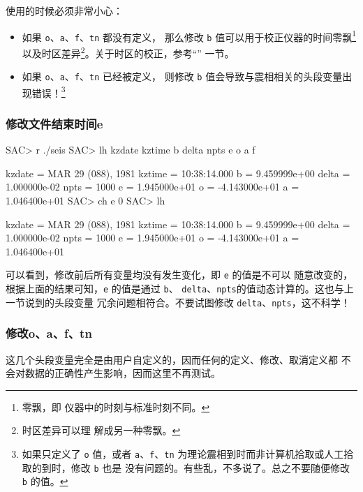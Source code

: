 使用的时候必须非常小心：
\begin{itemize}
\item 如果 \texttt{o}、\texttt{a}、\texttt{f}、\texttt{tn} 都没有定义，
    那么修改 \texttt{b} 值可以用于校正仪器的时间零飘\footnote{零飘，即
    仪器中的时刻与标准时刻不同。}以及时区差异\footnote{时区差异可以理
    解成另一种零飘。}。关于时区的校正，参考``''
    一节。
\item 如果 \texttt{o}、\texttt{a}、\texttt{f}、\texttt{tn} 已经被定义，
    则修改 \texttt{b} 值会导致与震相相关的头段变量出现错误！\footnote{
    如果只定义了 \texttt{o} 值，或者 \texttt{a}、\texttt{f}、\texttt{tn}
    为理论震相到时而非计算机拾取或人工拾取的到时，修改 \texttt{b} 也是
    没有问题的。有些乱，不多说了。总之不要随便修改 \texttt{b} 的值。}
\end{itemize}

\subsubsection{修改文件结束时间e}
\begin{SACCode}
SAC> r ./seis
SAC> lh kzdate kztime b delta npts e o a f

     kzdate = MAR 29 (088), 1981
     kztime = 10:38:14.000
          b = 9.459999e+00
      delta = 1.000000e-02
       npts = 1000
          e = 1.945000e+01
          o = -4.143000e+01
          a = 1.046400e+01
SAC> ch e 0
SAC> lh

     kzdate = MAR 29 (088), 1981
     kztime = 10:38:14.000
          b = 9.459999e+00
      delta = 1.000000e-02
       npts = 1000
          e = 1.945000e+01
          o = -4.143000e+01
          a = 1.046400e+01
\end{SACCode}

可以看到，修改前后所有变量均没有发生变化，即 \texttt{e} 的值是不可以
随意改变的，根据上面的结果可知，\texttt{e} 的值是通过 \texttt{b}、
\texttt{delta}、\texttt{npts}的值动态计算的。这也与上一节说到的头段变量
冗余问题相符合。不要试图修改 \texttt{delta}、\texttt{npts}，这不科学！

\subsubsection{修改o、a、f、tn}
这几个头段变量完全是由用户自定义的，因而任何的定义、修改、取消定义都
不会对数据的正确性产生影响，因而这里不再测试。

